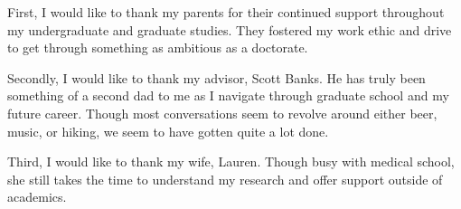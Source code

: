First, I would like to thank my parents for their continued support throughout my undergraduate and graduate studies. They fostered my work ethic and drive to get through something as ambitious as a doctorate.

Secondly, I would like to thank my advisor, Scott Banks. He has truly been something of a second dad to me as I navigate through graduate school and my future career. Though most conversations seem to revolve around either beer, music, or hiking, we seem to have gotten quite a lot done.

Third, I would like to thank my wife, Lauren. Though busy with medical school, she still takes the time to understand my research and offer support outside of academics.
